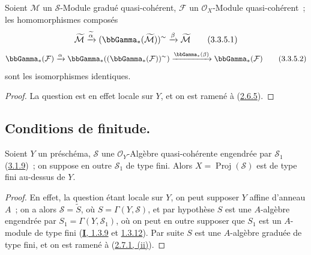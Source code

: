 \begin{proposition}[3.3.5]
\label{II.3.3.5-fr}
Soient $\mathcal{M}$ un $\mathcal{S}$-Module gradué quasi-cohérent,
$\mathcal{F}$ un $\mathcal{O}_X$-Module quasi-cohérent~; les homomorphismes
composés
\[
\label{II.3.3.5.1-fr}
  \widetilde{\mathcal{M}}
  \xrightarrow{\widetilde{\alpha}}
  (\bbGamma_*(\widetilde{\mathcal{M}}))^{\sim}
  \xrightarrow{\beta}\widetilde{\mathcal{M}}
\tag{3.3.5.1}
\]
\[
\label{II.3.3.5.2-fr}
  \bbGamma_*(\mathcal{F})\xrightarrow{\alpha}
  \bbGamma_*((\bbGamma_*(\mathcal{F}))^{\sim})
  \xrightarrow{\bbGamma_*(\beta)}\bbGamma_*(\mathcal{F})
\tag{3.3.5.2}
\]
sont les isomorphismes identiques.
\end{proposition}

\begin{proof}
La question est en effet locale sur $Y$, et on est ramené à
(\hyperref[II.2.6.5-fr]{2.6.5}).
\end{proof}


\subsection{Conditions de finitude.}
\label{subsection:II.3.4-fr}

\begin{proposition}[3.4.1]
\label{II.3.4.1-fr}
Soient $Y$ un préschéma, $\mathcal{S}$ une $\mathcal{O}_Y$-Algèbre
quasi-cohérente engendrée par $\mathcal{S}_1$
\textup{(\hyperref[II.3.1.9-fr]{3.1.9})}~; on suppose en outre $\mathcal{S}_1$ de type
fini. Alors $X=\operatorname{Proj}(\mathcal{S})$ est de type fini au-dessus de
$Y$.
\end{proposition}

\begin{proof}
En effet, la question étant locale sur $Y$, on peut supposer $Y$ affine
d'anneau $A$~; on a alors $\mathcal{S}=\widetilde{S}$, où
$S=\Gamma(Y,\mathcal{S})$, et par hypothèse $S$ est une $A$-algèbre engendrée
par $S_1=\Gamma(Y,\mathcal{S}_1)$, où on peut en outre supposer que $S_1$ est
un $A$-module de type fini
(\hyperref[I.1.3.9-fr]{\textbf{I}, 1.3.9} et
\hyperref[I.1.3.12-fr]{1.3.12}). Par suite $S$ est une $A$-algèbre graduée
de type fini, et on est ramené à
(\hyperref[II.2.7.1-fr]{2.7.1, (ii)}).
\end{proof}


